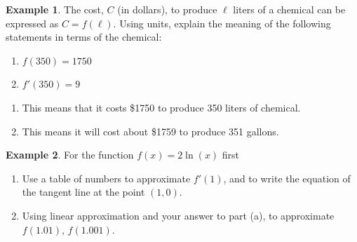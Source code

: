 \documentclass[oneside]{book}
\theoremstyle{definition}
\newtheorem{example}{Example}
\theoremstyle{solution}
\newtheorem*{solution}{Solution}
\newenvironment{solution}{\vspace{2in}\comment}{\endcomment}
\begin{document}
\begin{example}
  The cost, $C$ (in dollars), to produce $\ell$ liters of a chemical
  can be expressed as $C = f(\ell)$.  Using units, explain the meaning
  of the following statements in terms of the chemical:
  \begin{enumerate}
  \item $f(350)=1750$

  \item $f'(350)=9$
  \end{enumerate}
\end{example}

\begin{solution}
  \begin{enumerate}
  \item This means that it costs \$1750 to produce 350 liters of chemical.

  \item This means it will cost about \$1759 to produce 351 gallons.
  \end{enumerate}
\end{solution}

\begin{example}
For the function $f(x) = 2\ln(x)$ first
\begin{enumerate}
\item Use a table of numbers to approximate $f'(1)$, and to write the
  equation of the tangent line at the point $(1,0)$.
\item Using linear approximation and your answer to part (a), to
  approximate $f(1.01)$, $f(1.001)$.  
\end{enumerate}
\end{example}
\end{document}
